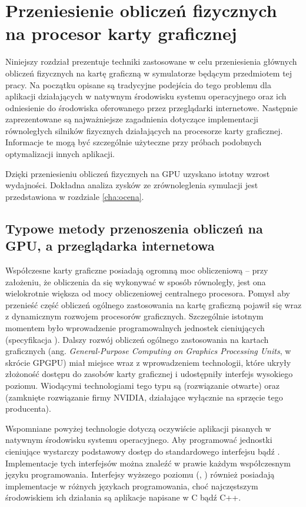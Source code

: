 \chapter{Przeniesienie obliczeń fizycznych na procesor karty graficznej}
\label{cha:oblGPU}

Niniejszy rozdział prezentuje techniki zastosowane w celu przeniesienia
głównych obliczeń fizycznych na kartę graficzną w symulatorze 
będącym przedmiotem tej pracy. Na początku opisane są tradycyjne podejścia do
tego problemu dla aplikacji działających w natywnym środowisku systemu
operacyjnego oraz ich odniesienie do środowiska oferowanego przez przeglądarki
internetowe. Następnie zaprezentowane są najważniejsze zagadnienia dotyczące
implementacji równoległych silników fizycznych  działających na
procesorze karty graficznej. Informacje te mogą być szczególnie użyteczne przy
próbach podobnych optymalizacji innych aplikacji.

Dzięki przeniesieniu obliczeń fizycznych na GPU uzyskano istotny wzrost
wydajności. Dokładna analiza zysków ze zrównoleglenia symulacji jest przedstawiona
w rozdziale \ref{cha:ocena}.

\section{Typowe metody przenoszenia obliczeń na GPU, a przeglądarka internetowa}

Współczesne karty graficzne posiadają ogromną moc obliczeniową -- przy
założeniu, że obliczenia da się wykonywać w sposób równoległy, jest ona
wielokrotnie większa od mocy obliczeniowej centralnego procesora. Pomysł aby
przenieść część obliczeń ogólnego zastosowania na kartę graficzną pojawił się
wraz z dynamicznym rozwojem procesorów graficznych. Szczególnie istotnym
momentem było wprowadzenie programowalnych jednostek cieniujących
(specyfikacja ). Dalszy rozwój obliczeń ogólnego zastosowania na
kartach graficznych (ang. \emph{General-Purpose Computing on Graphics
Processing Units}, w skrócie GPGPU) miał miejsce wraz z wprowadzeniem
technologii, które ukryły złożoność dostępu do zasobów karty graficznej i
udostępniły interfejs wysokiego poziomu. Wiodącymi technologiami tego typu są
 (rozwiązanie otwarte) oraz  (zamknięte rozwiązanie firmy
NVIDIA, działające wyłącznie na sprzęcie tego producenta).

Wspomniane powyżej technologie dotyczą oczywiście aplikacji pisanych w
natywnym środowisku systemu operacyjnego. Aby programować jednostki cieniujące
wystarczy podstawowy dostęp do standardowego interfejsu  bądź
. Implementacje tych interfejsów można znaleźć w prawie każdym
współczesnym języku programowania. Interfejsy wyższego poziomu (,
) również posiadają implementacje w różnych językach programowania,
choć najczęstszym środowiskiem ich działania są aplikacje napisane w C bądź
C++.

